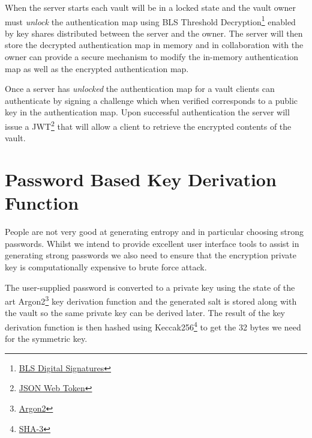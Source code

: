 \documentclass[a4paper,titlepage,oneside]{article}
\renewcommand{\paragraph}{\small}
\begin{document}
\paragraph{When the server starts each vault will be in a locked state and the vault owner must \emph{unlock} the authentication map using BLS Threshold Decryption\footnote{\href{https://en.wikipedia.org/wiki/BLS_digital_signature}{BLS Digital Signatures}} enabled by key shares distributed between the server and the owner. The server will then store the decrypted authentication map in memory and in collaboration with the owner can provide a secure mechanism to modify the in-memory authentication map as well as the encrypted authentication map.}

\paragraph{Once a server has \emph{unlocked} the authentication map for a vault clients can authenticate by signing a challenge which when verified corresponds to a public key in the authentication map. Upon successful authentication the server will issue a JWT\footnote{\href{https://en.wikipedia.org/wiki/JSON_Web_Token}{JSON Web Token}} that will allow a client to retrieve the encrypted contents of the vault.}

\section{Password Based Key Derivation Function}

\paragraph{People are not very good at generating entropy and in particular choosing strong passwords. Whilst we intend to provide excellent user interface tools to assist in generating strong passwords we also need to ensure that the encryption private key is computationally expensive to brute force attack.}

\paragraph{The user-supplied password is converted to a private key using the state of the art Argon2\footnote{\href{https://en.wikipedia.org/wiki/Argon2}{Argon2}} key derivation function and the generated salt is stored along with the vault so the same private key can be derived later. The result of the key derivation function is then hashed using Keccak256\footnote{\href{https://en.wikipedia.org/wiki/SHA-3}{SHA-3}} to get the 32 bytes we need for the symmetric key.}
\end{document}
